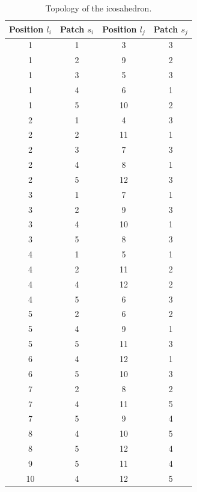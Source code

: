 \documentclass[a4paper, amsfonts, amssymb, amsmath, reprint, showkeys, nofootinbib, twoside]{revtex4-1}
\begin{document}
\begin{table}[h!]
	\begin{tabular}{ cccc } 
		\hline
		Position $l_i$ & Patch $s_i$ & Position $l_j$ & Patch $s_j$ \\
		\hline
		1 & 1 & 3 & 3 \\
		1 & 2 & 9 & 2 \\
		1 & 3 & 5 & 3 \\
		1 & 4 & 6 & 1 \\
		1 & 5 & 10 & 2 \\
		2 & 1 & 4 & 3 \\
		2 & 2 & 11 & 1 \\
		2 & 3 & 7 & 3 \\
		2 & 4 & 8 & 1 \\
		2 & 5 & 12 & 3 \\
		3 & 1 & 7 & 1 \\
		3 & 2 & 9 & 3 \\
		3 & 4 & 10 & 1 \\
		3 & 5 & 8 & 3 \\
		4 & 1 & 5 & 1 \\
		4 & 2 & 11 & 2 \\
		4 & 4 & 12 & 2 \\
		4 & 5 & 6 & 3 \\
		5 & 2 & 6 & 2 \\
		5 & 4 & 9 & 1 \\
		5 & 5 & 11 & 3 \\
		6 & 4 & 12 & 1 \\
		6 & 5 & 10 & 3 \\
		7 & 2 & 8 & 2 \\
		7 & 4 & 11 & 5 \\
		7 & 5 & 9 & 4 \\
		8 & 4 & 10 & 5 \\
		8 & 5 & 12 & 4 \\
		9 & 5 & 11 & 4 \\
		10 & 4 & 12 & 5 \\
		\hline
	\end{tabular}
	\caption{Topology of the icosahedron.}
\end{table}
\end{document}
